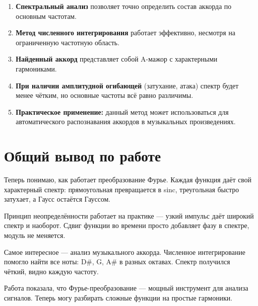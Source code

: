 \begin{enumerate}
    \item \textbf{Спектральный анализ} позволяет точно определить состав аккорда по основным частотам.
    
    \item \textbf{Метод численного интегрирования} работает эффективно, несмотря на ограниченную частотную область.
    
    \item \textbf{Найденный аккорд} представляет собой A-мажор с характерными гармониками.
    
    \item \textbf{При наличии амплитудной огибающей} (затухание, атака) спектр будет менее чётким, но основные частоты всё равно различимы.
    
    \item \textbf{Практическое применение:} данный метод может использоваться для автоматического распознавания аккордов в музыкальных произведениях.
\end{enumerate}

\section*{Общий вывод по работе}

Теперь понимаю, как работает преобразование Фурье. Каждая функция даёт свой характерный спектр: прямоугольная превращается в sinc, треугольная быстро затухает, а Гаусс остаётся Гауссом.

Принцип неопределённости работает на практике — узкий импульс даёт широкий спектр и наоборот. Сдвиг функции во времени просто добавляет фазу в спектре, модуль не меняется.

Самое интересное — анализ музыкального аккорда. Численное интегрирование помогло найти все ноты: D\#, G, A\# в разных октавах. Спектр получился чёткий, видно каждую частоту.

Работа показала, что Фурье-преобразование — мощный инструмент для анализа сигналов. Теперь могу разбирать сложные функции на простые гармоники.

